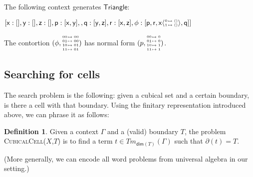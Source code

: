 \documentclass[11pt]{article}
\theoremstyle{definition}
\newtheorem{definition}{Definition}
\newcommand{\continuation}{??}
\newenvironment{examplecontd}[1]
{\renewcommand{\continuation}{\ref{#1}}\expcont[continued]}
{\endexpcont}
\newcommand{\problem}[1]{\textsc{{#1}}}
\newcommand{\mlist}[1]{[ {#1} ]}
\renewcommand{\dim}[1]{\mathsf{dim}({#1})}
\newcommand{\cont}[2]{ \ifthenelse{\equal{#2}{}}{#1}{{#1}\langle{#2}\rangle} }
\newcommand{\cset}[1]{\mathsf{{#1}}}
\newcommand{\boundary}[1]{\partial({#1})}
\newcommand{\substtwo}[2]{\tiny
  \arraycolsep=.4pt\def\arraystretch{1}
  \begin{array}{ll}
    0 &\mapsto {#1} \\
    1 &\mapsto {#2}
  \end{array}
}
\newcommand{\oneconst}{\substtwo{()}{()}}
\newcommand{\oneid}{\substtwo{0}{1}}
\newcommand{\substfour}[4]{\tiny
  \arraycolsep=.4pt\def\arraystretch{1}
  \begin{array}{ll}
    00 &\mapsto {#1} \\
    01 &\mapsto {#2} \\
    10 &\mapsto {#3} \\
    11 &\mapsto {#4} 
  \end{array}
}
\begin{document}
\begin{examplecontd}{exp:triangle}
  The following context generates $\cset{Triangle}$:
  

  $\mlist{ \cset{x} : \mlist{} , \cset{y} : \mlist{} , \cset{z} : \mlist{} ,
    \cset{p} : \mlist{ \cset{x}, \cset{y}  } ,
    , \cset{q} : \mlist{ \cset{y}, \cset{z} }
    , \cset{r} : \mlist{ \cset{x}, \cset{z} }
    , \cset{\phi} : \mlist{ \cset{p} , \cset{r} ,
      \cont{\cset{x}}{\oneconst}, \cset{q} }
  }$
  
  The contortion $(\phi,\substfour{00}{00}{01}{01})$ has normal form $(p,\substfour{0}{0}{1}{1})$.
\end{examplecontd}

\subsection{Searching for cells}

The search problem is the following: given a cubical set and a certain boundary,
is there a cell with that boundary. Using the finitary representation introduced
above, we can phrase it as follows:
  
\begin{definition}
  Given a context $\Gamma$ and a (valid) boundary $T$, the problem
  \problem{CubicalCell}($X$,$T$) is to find a term $t \in Tm_{\dim{T}}(\Gamma)$ such that
  $\boundary{t} = T$.
\end{definition}

(More generally, we can encode all word problems from universal algebra in our setting.)
\end{document}
